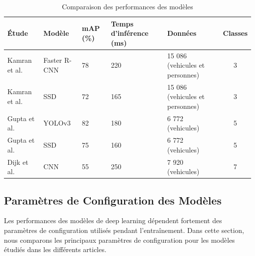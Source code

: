 \begin{table}[H]
    \centering
    \begin{tabularx}{\textwidth}{|p{3.1cm}|p{2.1cm}|p{1.1cm}|p{2.2cm}|X|c|}
        \hline
        \textbf{Étude}                  & \textbf{Modèle} & \textbf{mAP (\%)} & \textbf{Temps d'inférence (ms)} & \textbf{Données}                & \textbf{Classes} \\ \hline
        Kamran et al. \cite{kamran2020} & Faster R-CNN    & 78                & 220                             & 15 086 (vehicules et personnes) & 3                \\ \hline
        Kamran et al. \cite{kamran2020} & SSD             & 72                & 165                             & 15 086 (vehicules et personnes) & 3                \\ \hline
        Gupta et al. \cite{gupta2021}   & YOLOv3          & 82                & 180                             & 6 772  (vehicules)              & 5                \\ \hline
        Gupta et al. \cite{gupta2021}   & SSD             & 75                & 160                             & 6 772  (vehicules)              & 5                \\ \hline
        Dijk et al. \cite{spie2020}     & CNN             & 55                & 250                             & 7 920  (vehicules)              & 7                \\ \hline
    \end{tabularx}
    \caption{Comparaison des performances des modèles}
    \label{tab:comparaison}
\end{table}

\subsection{Paramètres de Configuration des Modèles}

Les performances des modèles de deep learning dépendent fortement des paramètres de configuration utilisés pendant l'entraînement. Dans cette section, nous comparons les principaux paramètres de configuration pour les modèles étudiés dans les différents articles.

